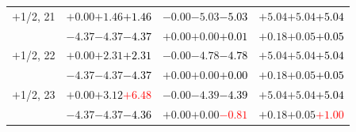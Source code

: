\documentclass[compress]{beamer}
\begin{document}
\begin{frame}
\begin{tabular}{r | c | c | c}
$+$1/2, 21 & $+0.00$\hspace{0.1 cm}$+1.46$\hspace{0.1 cm}\textcolor{black}{$+1.46$} & $-0.00$\hspace{0.1 cm}$-5.03$\hspace{0.1 cm}\textcolor{black}{$-5.03$} & $+5.04$\hspace{0.1 cm}$+5.04$\hspace{0.1 cm}\textcolor{black}{$+5.04$} \\
           & $-4.37$\hspace{0.1 cm}$-4.37$\hspace{0.1 cm}\textcolor{black}{$-4.37$} & $+0.00$\hspace{0.1 cm}$+0.00$\hspace{0.1 cm}\textcolor{black}{$+0.01$} & $+0.18$\hspace{0.1 cm}$+0.05$\hspace{0.1 cm}\textcolor{black}{$+0.05$} \\
$+$1/2, 22 & $+0.00$\hspace{0.1 cm}$+2.31$\hspace{0.1 cm}\textcolor{black}{$+2.31$} & $-0.00$\hspace{0.1 cm}$-4.78$\hspace{0.1 cm}\textcolor{black}{$-4.78$} & $+5.04$\hspace{0.1 cm}$+5.04$\hspace{0.1 cm}\textcolor{black}{$+5.04$} \\
           & $-4.37$\hspace{0.1 cm}$-4.37$\hspace{0.1 cm}\textcolor{black}{$-4.37$} & $+0.00$\hspace{0.1 cm}$+0.00$\hspace{0.1 cm}\textcolor{black}{$+0.00$} & $+0.18$\hspace{0.1 cm}$+0.05$\hspace{0.1 cm}\textcolor{black}{$+0.05$} \\
$+$1/2, 23 & $+0.00$\hspace{0.1 cm}$+3.12$\hspace{0.1 cm}\textcolor{red}{$+6.48$} & $-0.00$\hspace{0.1 cm}$-4.39$\hspace{0.1 cm}\textcolor{black}{$-4.39$} & $+5.04$\hspace{0.1 cm}$+5.04$\hspace{0.1 cm}\textcolor{black}{$+5.04$} \\
           & $-4.37$\hspace{0.1 cm}$-4.37$\hspace{0.1 cm}\textcolor{black}{$-4.36$} & $+0.00$\hspace{0.1 cm}$+0.00$\hspace{0.1 cm}\textcolor{red}{$-0.81$} & $+0.18$\hspace{0.1 cm}$+0.05$\hspace{0.1 cm}\textcolor{red}{$+1.00$} \\

\end{tabular}
\end{frame}
\end{document}
